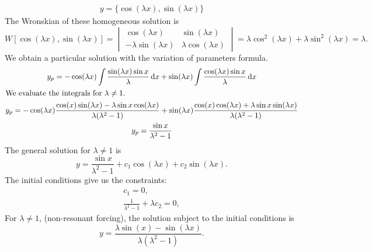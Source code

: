 {\begin{Solution}
\begin{enumerate}
\begin{gather*}
      y = \{ \cos( \lambda x ), \sin( \lambda x ) \}
    \end{gather*}
    The Wronskian of these homogeneous solution is
    \[
    W[\cos(\lambda x), \sin(\lambda x)] = 
    \begin{vmatrix}
      \cos(\lambda x) & \sin(\lambda x) \\
      - \lambda \sin(\lambda x) & \lambda \cos(\lambda x) 
    \end{vmatrix}
    = \lambda \cos^2(\lambda x) + \lambda \sin^2(\lambda x) = \lambda.
    \]
    We obtain a particular solution with the variation of parameters formula.
    \begin{gather*}
      y_p = - \cos(\lambda x) \int \frac{ \sin(\lambda x) \sin x }{\lambda} \,\mathrm{d} x
      + \sin(\lambda x) \int \frac{ \cos(\lambda x) \sin x }{\lambda} \,\mathrm{d} x\\
      \intertext{We evaluate the integrals for $\lambda \neq 1$.}
      y_p = - \cos(\lambda x) 
      \frac{ \cos(x) \sin(\lambda x) - \lambda \sin x \cos(\lambda x) }
      { \lambda(\lambda^2 - 1) } 
      + \sin(\lambda x) 
      \frac{ \cos(x) \cos(\lambda x) + \lambda \sin x \sin(\lambda x) }
      { \lambda(\lambda^2 - 1) } \\
      y_p = \frac{ \sin x }{ \lambda^2 - 1 }
    \end{gather*}
    The general solution for $\lambda \neq 1$ is
    \[
    y = \frac{ \sin x }{ \lambda^2 - 1 } + c_1 \cos(\lambda x) 
    + c_2 \sin(\lambda x).
    \]
    The initial conditions give us the constraints:
    \begin{gather*}
      c_1 = 0, \\
      \frac{1}{\lambda^2 - 1} + \lambda c_2 = 0,
    \end{gather*}
    For $\lambda \neq 1$, (non-resonant forcing), the solution subject to the 
    initial conditions is
    \[
    \boxed{
      y = \frac{ \lambda \sin(x) - \sin(\lambda x) }{ \lambda (\lambda^2 - 1) }.
      }
    \]


\end{enumerate}
\end{Solution}}
